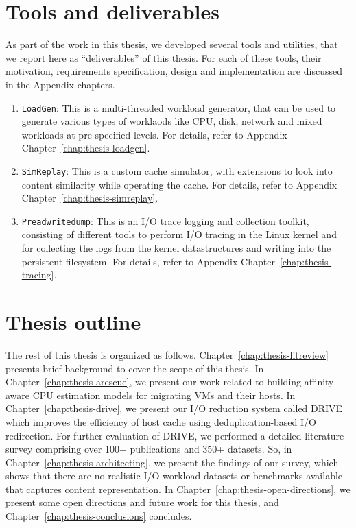 \section{Tools and deliverables}
As part of the work in this thesis, we developed several tools and utilities,
that we report here as ``deliverables'' of this thesis. For each of these
tools, their motivation, requirements specification, design and 
implementation are discussed in the Appendix chapters.
\begin{enumerate}
	\item \texttt{LoadGen}: This is a multi-threaded workload generator, 
		that can be used to generate various types of worklaods like
		CPU, disk, network and mixed workloads at pre-specified levels.
		For details, refer to Appendix Chapter~\ref{chap:thesis-loadgen}.
	\item \texttt{SimReplay}: This is a custom cache simulator, with 
		extensions to look into content similarity while operating 
		the cache. For details, refer to Appendix 
		Chapter~\ref{chap:thesis-simreplay}.
	\item \texttt{Preadwritedump}: This is an I/O trace logging and
		collection toolkit, consisting of different tools to perform
		I/O tracing in the Linux kernel and for collecting the logs
		from the kernel datastructures and writing 
		into the persistent filesystem. For details, refer to Appendix 
        Chapter~\ref{chap:thesis-tracing}.
\end{enumerate}

\section{Thesis outline}
The rest of this thesis is organized as follows. 
Chapter~\ref{chap:thesis-litreview} presents brief background 
to cover the scope of this thesis.
In Chapter~\ref{chap:thesis-arescue}, we present our work
related to building affinity-aware CPU estimation models 
for migrating VMs and their hosts. In Chapter~\ref{chap:thesis-drive},
we present our I/O reduction system called DRIVE which
improves the efficiency of host cache using deduplication-based
I/O redirection. For further evaluation of DRIVE, we 
performed a detailed literature survey comprising over 100+
publications and 350+ datasets. So, in 
Chapter~\ref{chap:thesis-architecting},
we present the findings of our survey, 
which shows that there are no realistic I/O workload datasets 
or benchmarks available that captures content representation.
In Chapter~\ref{chap:thesis-open-directions}, we present
some open directions and future work for this thesis,
and Chapter~\ref{chap:thesis-conclusions} concludes.

